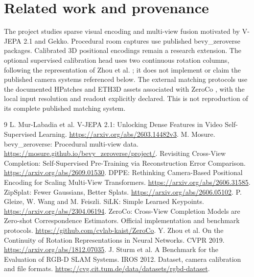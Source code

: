 \documentclass[10pt]{article}
\begin{document}
\section{Related work and provenance}
The project studies sparse visual encoding and multi-view fusion motivated by V-JEPA 2.1 and Gekko. Procedural room captures use published bevy\_zeroverse packages. Calibrated 3D positional encodings remain a research extension. The optional supervised calibration head uses two continuous rotation columns, following the representation of Zhou et al. \cite{rotation6d}; it does not implement or claim the published camera systems referenced below.
The external matching protocols use the documented HPatches and ETH3D assets associated with ZeroCo \cite{zeroco}, with the local input resolution and readout explicitly declared. This is not reproduction of its complete published matching system.
\begin{thebibliography}{9}
 L. Mur-Labadia et al. V-JEPA 2.1: Unlocking Dense Features in Video Self-Supervised Learning. \url{https://arxiv.org/abs/2603.14482v3}.
 M. Mosure. bevy\_zeroverse: Procedural multi-view data. \url{https://mosure.github.io/bevy_zeroverse/project/}.
 Revisiting Cross-View Completion: Self-Supervised Pre-Training via Reconstruction Error Comparison. \url{https://arxiv.org/abs/2609.01530}.
 DPPE: Rethinking Camera-Based Positional Encoding for Scaling Multi-View Transformers. \url{https://arxiv.org/abs/2606.31585}.
 ZipSplat: Fewer Gaussians, Better Splats. \url{https://arxiv.org/abs/2606.05102}.
 P. Gleize, W. Wang and M. Feiszli. SiLK: Simple Learned Keypoints. \url{https://arxiv.org/abs/2304.06194}.
 ZeroCo: Cross-View Completion Models are Zero-shot Correspondence Estimators. Official implementation and benchmark protocols. \url{https://github.com/cvlab-kaist/ZeroCo}.
 Y. Zhou et al. On the Continuity of Rotation Representations in Neural Networks. CVPR 2019. \url{https://arxiv.org/abs/1812.07035}.
 J. Sturm et al. A Benchmark for the Evaluation of RGB-D SLAM Systems. IROS 2012. Dataset, camera calibration and file formats. \url{https://cvg.cit.tum.de/data/datasets/rgbd-dataset}.
\end{thebibliography}
\end{document}
